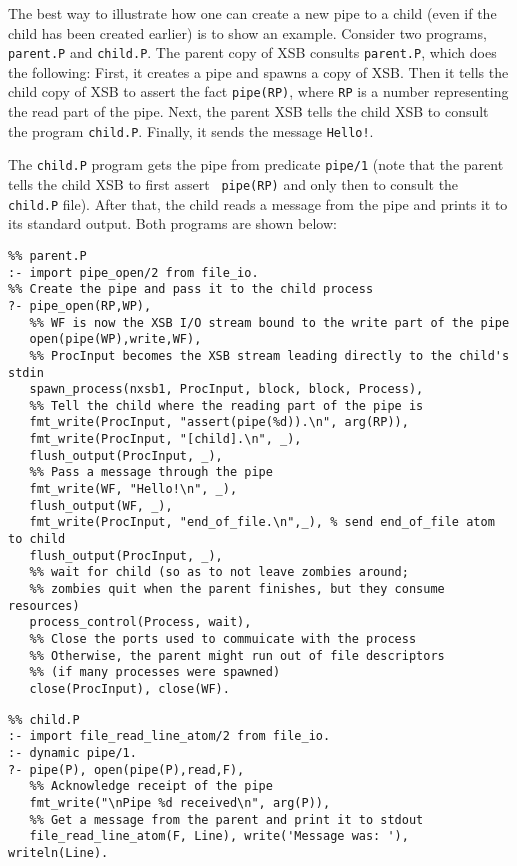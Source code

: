 \begin{description}
    The best way to illustrate how one can create a new pipe to a child
    (even if the child has been created earlier) is to show an example.
    Consider two programs, {\tt parent.P} and {\tt child.P}. The parent
    copy of XSB consults {\tt parent.P}, which does the following: First, it
    creates a pipe and spawns a copy of XSB. Then it tells the
    child copy of XSB to assert the fact {\tt pipe(RP)}, where {\tt RP} is
    a number representing the read part of the pipe. Next, the parent XSB tells
    the child XSB to consult the program {\tt child.P}. Finally, it sends
    the message {\tt Hello!}.

    The {\tt child.P} program gets the pipe from predicate {\tt pipe/1}
    (note that the parent tells the child XSB to first assert {\tt
    pipe(RP)} and only then to consult the {\tt child.P} file).
  After that, the child reads a message from the pipe and prints it to its
    standard output. Both programs are shown below:
    \begin{verbatim}
%% parent.P      
:- import pipe_open/2 from file_io.
%% Create the pipe and pass it to the child process
?- pipe_open(RP,WP),
   %% WF is now the XSB I/O stream bound to the write part of the pipe
   open(pipe(WP),write,WF),
   %% ProcInput becomes the XSB stream leading directly to the child's stdin
   spawn_process(nxsb1, ProcInput, block, block, Process),
   %% Tell the child where the reading part of the pipe is
   fmt_write(ProcInput, "assert(pipe(%d)).\n", arg(RP)),
   fmt_write(ProcInput, "[child].\n", _),
   flush_output(ProcInput, _),
   %% Pass a message through the pipe
   fmt_write(WF, "Hello!\n", _),
   flush_output(WF, _),
   fmt_write(ProcInput, "end_of_file.\n",_), % send end_of_file atom to child
   flush_output(ProcInput, _),
   %% wait for child (so as to not leave zombies around; 
   %% zombies quit when the parent finishes, but they consume resources)
   process_control(Process, wait),
   %% Close the ports used to commuicate with the process
   %% Otherwise, the parent might run out of file descriptors 
   %% (if many processes were spawned)
   close(ProcInput), close(WF).
    \end{verbatim}
    \begin{verbatim}
%% child.P
:- import file_read_line_atom/2 from file_io.
:- dynamic pipe/1.
?- pipe(P), open(pipe(P),read,F),
   %% Acknowledge receipt of the pipe
   fmt_write("\nPipe %d received\n", arg(P)),
   %% Get a message from the parent and print it to stdout
   file_read_line_atom(F, Line), write('Message was: '), writeln(Line).

\end{verbatim}
\end{description}

